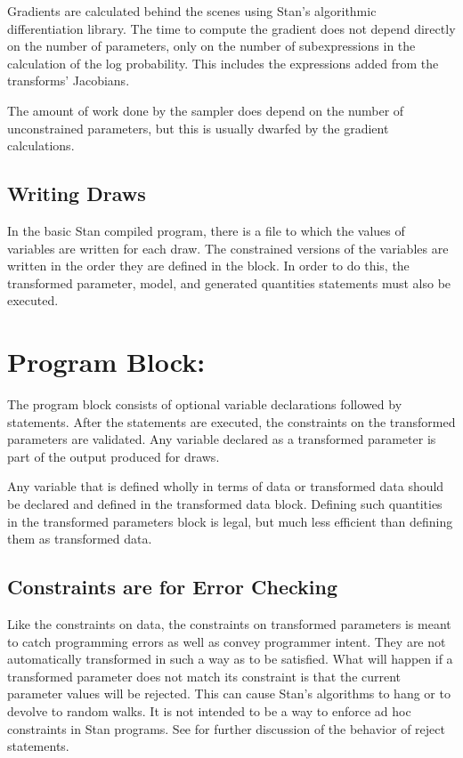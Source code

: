Gradients are calculated behind the scenes using Stan's algorithmic
differentiation library.  The time to compute the gradient does not
depend directly on the number of parameters, only on the number of
subexpressions in the calculation of the log probability.  This
includes the expressions added from the transforms' Jacobians.

The amount of work done by the sampler does depend on the number of
unconstrained parameters, but this is usually dwarfed by the gradient
calculations.

\subsection{Writing Draws}

In the basic Stan compiled program, there is a file to which the
values of variables are written for each draw.  The constrained
versions of the variables are written in the order they are
defined in the  block.  In order to do this, the
transformed parameter, model, and generated quantities statements must
also be executed.


\section{Program Block: }

The  program block consists of optional
variable declarations followed by statements.  After the statements
are executed, the constraints on the transformed parameters are
validated.  Any variable declared as a transformed parameter is part
of the output produced for draws.

Any variable that is defined wholly in terms of data or transformed
data should be declared and defined in the transformed data block.
Defining such quantities in the transformed parameters block is legal,
but much less efficient than defining them as transformed data.

\subsection{Constraints are for Error Checking}

Like the constraints on data, the constraints on transformed
parameters is meant to catch programming errors as well as convey
programmer intent.  They are not automatically transformed in such a
way as to be satisfied.  What will happen if a transformed parameter
does not match its constraint is that the current parameter values
will be rejected.  This can cause Stan's algorithms to hang or
to devolve to random walks.  It is not intended to be a way to enforce
ad hoc constraints in Stan programs.   See 
for further discussion of the behavior of reject statements.



